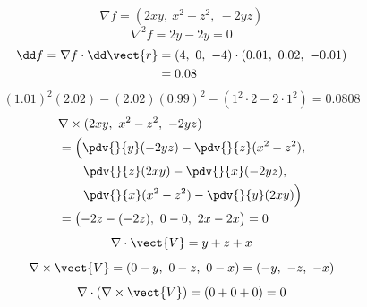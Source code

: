 \[ \nabla f=(2xy,\ x^{2}-z^{2},\ -2yz) \]
\[ \nabla^{2}f=2y-2y=0 \]
\begin{align*}
\dd f=\nabla f\cdot\dd\vect{r}&=(4,\ 0,\ -4)\cdot(0.01,\ 0.02,\ -0.01)\\
&=0.08
\end{align*}
\[ (1.01)^{2}(2.02)-(2.02)(0.99)^{2}-(1^{2}\cdot2-2\cdot1^{2})=0.0808 \]
\begin{align*}
&\nabla\times(2xy,\ x^{2}-z^{2},\ -2yz)\\
&=\Bigl(\pdv{}{y}(-2yz)-\pdv{}{z}(x^{2}-z^{2}),\\
&\qquad\pdv{}{z}(2xy)-\pdv{}{x}(-2yz),\\
&\qquad\pdv{}{x}(x^{2}-z^{2})-\pdv{}{y}(2xy)\Bigr)\\
&=\bigl(-2z-(-2z),\ 0-0,\ 2x-2x\bigr)=0
\end{align*}
\[ \nabla\cdot\vect{V}=y+z+x \]
\[ \nabla\times\vect{V}=(0-y,\ 0-z,\ 0-x)=(-y,\ -z,\ -x) \]
\[ \nabla\cdot(\nabla\times\vect{V})=(0+0+0)=0 \]
